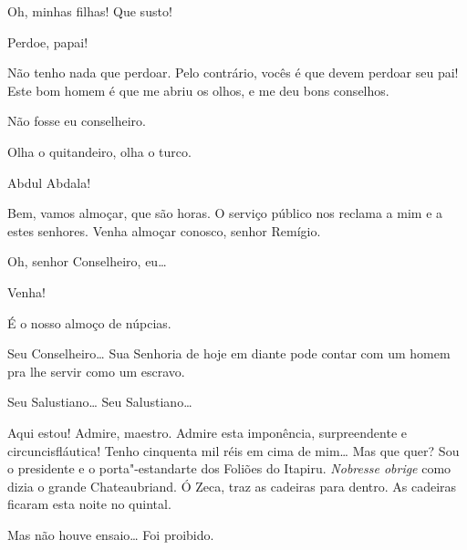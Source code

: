 

 Oh, minhas filhas! Que susto!

 Perdoe, papai!

 Não tenho nada que perdoar.  Pelo contrário, vocês é que
devem perdoar seu pai! Este bom homem é que me abriu os olhos, e me deu bons
conselhos.

 Não fosse eu conselheiro.

   Olha o quitandeiro, olha o
turco.

 Abdul Abdala!

 Bem, vamos almoçar, que são horas. O serviço público nos
reclama a mim e a estes senhores. Venha almoçar conosco, senhor Remígio.

 Oh, senhor Conselheiro, eu\ldots{}

 Venha!

 É o nosso almoço de núpcias. 

 Seu Conselheiro\ldots{} Sua Senhoria de hoje em diante pode contar
com um homem pra lhe servir como um escravo. 







 Seu Salustiano\ldots{} Seu Salustiano\ldots{} 

 Aqui estou! Admire, maestro. Admire esta imponência,
surpreendente e circuncisfláutica! Tenho cinquenta mil réis em cima de mim\ldots{} 
Mas que quer? Sou o presidente e o porta"-estandarte dos Foliões do
Itapiru. \textit{Nobresse obrige} como dizia o grande
Chateaubriand.  Ó Zeca, traz as cadeiras para dentro.  As cadeiras ficaram esta noite no quintal.

 Mas não houve ensaio\ldots{}  Foi proibido.

